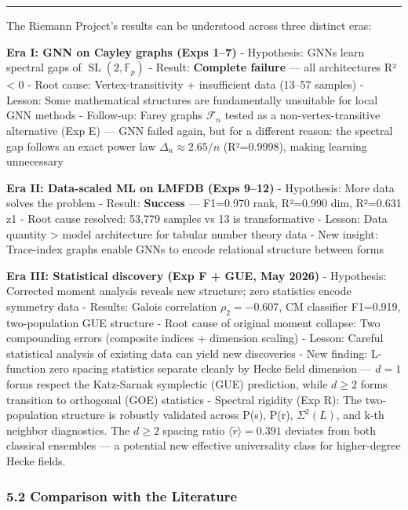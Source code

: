 \documentclass[
]{article}
\begin{document}
\begin{center}\rule{0.5\linewidth}{0.5pt}\end{center}

The Riemann Project's results can be understood across three distinct
eras:

\textbf{Era I: GNN on Cayley graphs (Exps 1--7)} - Hypothesis: GNNs
learn spectral gaps of \(\operatorname{SL}(2,\mathbb{F}_p)\) - Result:
\textbf{Complete failure} --- all architectures R² \textless{} 0 - Root
cause: Vertex-transitivity + insufficient data (13--57 samples) -
Lesson: Some mathematical structures are fundamentally unsuitable for
local GNN methods - Follow-up: Farey graphs \(\mathcal{F}_n\) tested as
a non-vertex-transitive alternative (Exp E) --- GNN failed again, but
for a different reason: the spectral gap follows an exact power law
\(\Delta_n \approx 2.65/n\) (R²=0.9998), making learning unnecessary

\textbf{Era II: Data-scaled ML on LMFDB (Exps 9--12)} - Hypothesis: More
data solves the problem - Result: \textbf{Success} --- F1=0.970 rank,
R²=0.990 dim, R²=0.631 z1 - Root cause resolved: 53,779 samples vs 13 is
transformative - Lesson: Data quantity \textgreater{} model architecture
for tabular number theory data - New insight: Trace-index graphs enable
GNNs to encode relational structure between forms

\textbf{Era III: Statistical discovery (Exp F + GUE, May 2026)} -
Hypothesis: Corrected moment analysis reveals new structure; zero
statistics encode symmetry data - Results: Galois correlation
\(\rho_2 = -0.607\), CM classifier F1=0.919, two-population GUE
structure - Root cause of original moment collapse: Two compounding
errors (composite indices + dimension scaling) - Lesson: Careful
statistical analysis of existing data can yield new discoveries - New
finding: L-function zero spacing statistics separate cleanly by Hecke
field dimension --- \(d=1\) forms respect the Katz-Sarnak symplectic
(GUE) prediction, while \(d\ge 2\) forms transition to orthogonal (GOE)
statistics - Spectral rigidity (Exp R): The two-population structure is
robustly validated across P(s), P(r), \(\Sigma^2(L)\), and k-th neighbor
diagnostics. The \(d\ge 2\) spacing ratio
\(\langle\tilde{r}\rangle = 0.391\) deviates from both classical
ensembles --- a potential new effective universality class for
higher-degree Hecke fields.

\hypertarget{comparison-with-the-literature}{%
\subsubsection{5.2 Comparison with the
Literature}\label{comparison-with-the-literature}}
\end{document}
